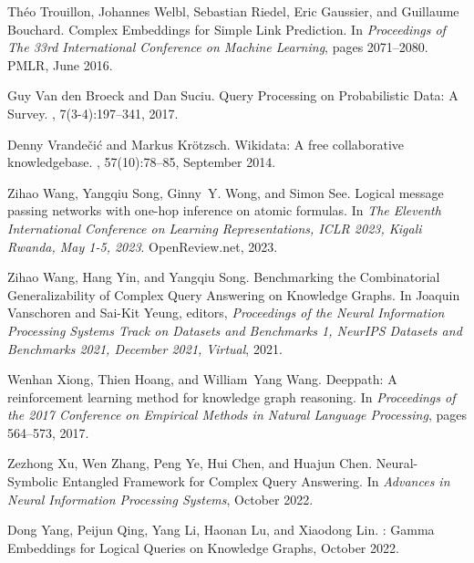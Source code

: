 \documentclass[11pt]{article}
\begin{document}
\begin{thebibliography}{10}
Th{\'e}o Trouillon, Johannes Welbl, Sebastian Riedel, Eric Gaussier, and
  Guillaume Bouchard.
\newblock Complex {{Embeddings}} for {{Simple Link Prediction}}.
\newblock In {\em Proceedings of {{The}} 33rd {{International Conference}} on
  {{Machine Learning}}}, pages 2071--2080. {PMLR}, June 2016.

Guy {Van den Broeck} and Dan Suciu.
\newblock Query {{Processing}} on {{Probabilistic Data}}: {{A Survey}}.
,
  7(3-4):197--341, 2017.

Denny Vrande{\v c}i{\'c} and Markus Kr{\"o}tzsch.
\newblock Wikidata: A free collaborative knowledgebase.
, 57(10):78--85, September 2014.

Zihao Wang, Yangqiu Song, Ginny~Y. Wong, and Simon See.
\newblock Logical message passing networks with one-hop inference on atomic
  formulas.
\newblock In {\em The Eleventh International Conference on Learning
  Representations, {ICLR} 2023, Kigali Rwanda, May 1-5, 2023}. OpenReview.net,
  2023.

Zihao Wang, Hang Yin, and Yangqiu Song.
\newblock Benchmarking the {{Combinatorial Generalizability}} of {{Complex
  Query Answering}} on {{Knowledge Graphs}}.
\newblock In Joaquin Vanschoren and Sai-Kit Yeung, editors, {\em Proceedings of
  the {{Neural Information Processing Systems Track}} on {{Datasets}} and
  {{Benchmarks}} 1, {{NeurIPS Datasets}} and {{Benchmarks}} 2021, {{December}}
  2021, Virtual}, 2021.

Wenhan Xiong, Thien Hoang, and William~Yang Wang.
\newblock Deeppath: A reinforcement learning method for knowledge graph
  reasoning.
\newblock In {\em Proceedings of the 2017 Conference on Empirical Methods in
  Natural Language Processing}, pages 564--573, 2017.

Zezhong Xu, Wen Zhang, Peng Ye, Hui Chen, and Huajun Chen.
\newblock Neural-{{Symbolic Entangled Framework}} for {{Complex Query
  Answering}}.
\newblock In {\em Advances in {{Neural Information Processing Systems}}},
  October 2022.

Dong Yang, Peijun Qing, Yang Li, Haonan Lu, and Xiaodong Lin.
: {{Gamma Embeddings}} for {{Logical Queries}} on
  {{Knowledge Graphs}}, October 2022.


\end{thebibliography}
\end{document}
